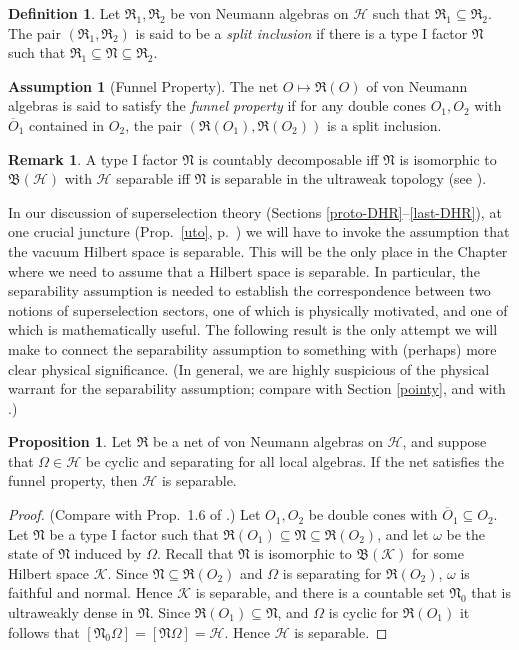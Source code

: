 \documentclass[11pt]{article}
\newcommand{\alg}[1]{\mathfrak{#1}}
\newcommand{\bh}{\mathfrak{B}(\mathcal{H})}
\theoremstyle{definition}
\newtheorem{assumption}{Assumption}
\newtheorem{prop}[thm]{Proposition}
\theoremstyle{definition}
\newtheorem{defn}[thm]{Definition}
\newtheorem{note}[thm]{Remark}
\theoremstyle{remark}
\def\2#1{{\mathcal #1}}
\def\ol#1{{\overline #1}}
\def\al#1{{\mathfrak #1}}
\def\om{\omega} \def\Om{\Omega} \def\dd{\partial} \def\D{\Delta}
\begin{document}
\begin{defn} Let $\al R_1,\al R_2$ be von Neumann
  algebras on $\2H$ such that $\al R_1\subseteq \al
  R_2$.  The pair $(\al R_1,\al R_2)$ is said to be a
  \emph{split inclusion} if there is a type I factor
  $\al N$ such that $\al R_1\subseteq \al N\subseteq
  \al R_2$.  \label{banana} \end{defn}

\begin{assumption}[Funnel Property] The net $O\mapsto
  \al R(O)$ of von Neumann algebras is said to satisfy
  the \emph{funnel property} if for any double cones
  $O_1,O_2$ with $\ol O_1$ contained in $O_2$, the pair
  $(\al R(O_1),\al R(O_2))$ is a split inclusion.
\end{assumption}

\begin{note} A type I factor $\alg{N}$ is countably decomposable iff
  $\alg{N}$ is isomorphic to $\bh$ with $\2H$ separable iff $\alg{N}$
  is separable in the ultraweak topology (see \cite[Exercise
  5.7.7]{kr}).
\end{note}

In our discussion of superselection theory (Sections
\ref{proto-DHR}--\ref{last-DHR}), at one crucial juncture (Prop.\
\ref{uto}, p.\ \pageref{uto}) we will have to invoke the assumption
that the vacuum Hilbert space is separable.  This will be the only
place in the Chapter where we need to assume that a Hilbert space is
separable.  In particular, the separability assumption is needed to
establish the correspondence between two notions of superselection
sectors, one of which is physically motivated, and one of which is
mathematically useful.  The following result is the only attempt we
will make to connect the separability assumption to something with
(perhaps) more clear physical significance.  (In general, we are
highly suspicious of the physical warrant for the separability
assumption; compare with Section \ref{pointy}, and with \cite{hans}.)

\begin{prop} Let $\alg{R}$ be a net of von Neumann algebras on $\2H$,
  and suppose that $\Om \in \2H$ be cyclic and separating for all
  local algebras.  If the net satisfies the funnel property, then
  $\2H$ is separable.  \label{separable}
\end{prop}

\begin{proof} (Compare with Prop.\ 1.6 of \cite{split}.) Let $O_1,O_2$
  be double cones with $\ol O_1\subseteq O_2$.  Let $\alg{N}$ be a
  type I factor such that $\alg{R}(O_1)\subseteq \alg{N}\subseteq
  \alg{R}(O_2)$, and let $\om$ be the state of $\alg{N}$ induced by
  $\Om$.  Recall that $\alg{N}$ is isomorphic to $\alg{B}(\2K )$ for
  some Hilbert space $\2K$.  Since $\alg{N}\subseteq \alg{R}(O_2)$ and
  $\Om$ is separating for $\alg{R}(O_2)$, $\om$ is faithful and
  normal.  Hence $\2K$ is separable, and there is a countable set
  $\alg{N}_0$ that is ultraweakly dense in $\alg{N}$.  Since
  $\alg{R}(O_1)\subseteq \alg{N}$, and $\Om$ is cyclic for
  $\alg{R}(O_1)$ it follows that $[\alg{N}_0\Om ]=[\alg{N}\Om ]=\2H$.
  Hence $\2H$ is separable.  \end{proof}
\end{document}
